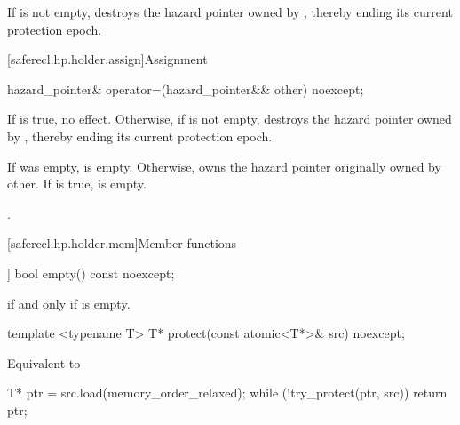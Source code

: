\begin{itemdescr}

\pnum
\effects 
If  is not empty, destroys the hazard pointer owned by , thereby ending its current protection epoch.

\end{itemdescr}

[saferecl.hp.holder.assign]{Assignment}

\begin{itemdecl}
hazard_pointer& operator=(hazard_pointer&& other) noexcept;
\end{itemdecl}

\begin{itemdescr}

\pnum
\effects 
If  is true, no effect. Otherwise, if  is not empty, destroys
the hazard pointer owned by , thereby ending its current protection epoch.

\pnum
\ensures 
If  was empty,  is empty. Otherwise,  owns the hazard
pointer originally owned by other. If  is true,  is empty.

\pnum
\returns 
{}.

\end{itemdescr}

[saferecl.hp.holder.mem]{Member functions}

\begin{itemdecl}
[[nodiscard]] bool empty() const noexcept;
\end{itemdecl}

\begin{itemdescr}

\pnum
\returns 
{} if and only if  is empty.

\end{itemdescr}


\begin{itemdecl}
template <typename T> T* protect(const atomic<T*>& src) noexcept;
\end{itemdecl}

\begin{itemdescr}

\pnum
\effects 
Equivalent to
\begin{codeblock}
T* ptr = src.load(memory_order_relaxed);
while (!try_protect(ptr, src)) {}
return ptr;
\end{codeblock}

\end{itemdescr}

